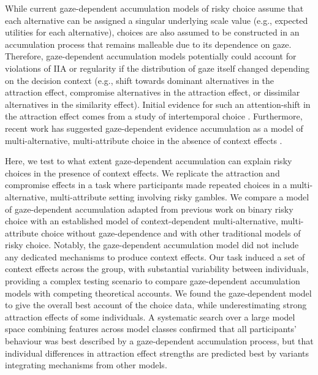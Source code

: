 \documentclass[11pt, a4paper]{article}
\begin{document}
While current gaze-dependent accumulation models of risky choice assume that each alternative can be assigned a singular underlying scale value (e.g., expected utilities for each alternative), choices are also assumed to be constructed in an accumulation process that remains malleable due to its dependence on gaze. Therefore, gaze-dependent accumulation models potentially could account for violations of IIA or regularity if the distribution of gaze itself changed depending on the decision context (e.g., shift towards dominant alternatives in the attraction effect, compromise alternatives in the attraction effect, or dissimilar alternatives in the similarity effect). Initial evidence for such an attention-shift in the attraction effect comes from a study of intertemporal choice \autocite{marini2020AttractionComesMany}. Furthermore, recent work has suggested gaze-dependent evidence accumulation as a model of multi-alternative, multi-attribute choice in the absence of context effects \autocite{cohen2017MultiattributeMultialternativeModels,gluth2018ValuebasedAttentionalCapture}.

Here, we test to what extent gaze-dependent accumulation can explain risky choices in the presence of context effects. We replicate the attraction and compromise effects in a task where participants made repeated choices in a multi-alternative, multi-attribute setting involving risky gambles. We compare a model of gaze-dependent accumulation adapted from previous work on binary risky choice \autocite{glickman2019FormationPreferenceRisky} with an established model of context-dependent multi-alternative, multi-attribute choice without gaze-dependence and with other traditional models of risky choice. Notably, the gaze-dependent accumulation model did not include any dedicated mechanisms to produce context effects. Our task induced a set of context effects across the group, with substantial variability between individuals, providing a complex testing scenario to compare gaze-dependent accumulation models with competing theoretical accounts. We found the gaze-dependent model to give the overall best account of the choice data, while underestimating strong attraction effects of some individuals. A systematic search over a large model space combining features across model classes confirmed that all participants’ behaviour was best described by a gaze-dependent accumulation process, but that individual differences in attraction effect strengths are predicted best by variants integrating mechanisms from other models.
\end{document}
